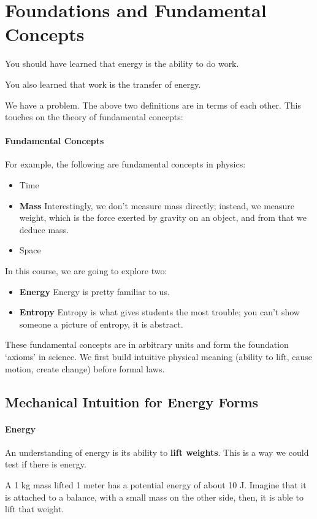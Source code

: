 \documentclass[11pt]{report}
\begin{document}
\section{Foundations and Fundamental Concepts}
\begin{definition}[Energy]
    You should have learned that energy is the ability to do work.
\end{definition}


\begin{definition}[Work]
    You also learned that work is the transfer of energy.
\end{definition}

We have a problem. The above two definitions are in terms of each other. This touches on the theory of fundamental concepts:

\paragraph{Fundamental Concepts} For example, the following are fundamental concepts in physics:
\begin{itemize}
    \item Time
    \item \textbf{Mass} Interestingly, we don't measure mass directly; instead, we measure weight, which is the force exerted by gravity on an object, and from that we deduce mass.
    \item Space
\end{itemize}
In this course, we are going to explore two:
\begin{itemize}
    \item \textbf{Energy} Energy is pretty familiar to us. 
    \item \textbf{Entropy} Entropy is what gives students the most trouble; you can't show someone a picture of entropy, it is abstract.
\end{itemize}

These fundamental concepts are in arbitrary units and form the foundation `axioms' in science. We first build intuitive physical meaning (ability to lift, cause motion, create change) before formal laws.

\subsection{Mechanical Intuition for Energy Forms}
\paragraph{Energy} An understanding of energy is its ability to \textbf{lift weights}. This is a way we could test if there is energy.
\begin{example}
    A 1 kg mass lifted 1 meter has a potential energy of about 10 J. Imagine that it is attached to a balance, with a small mass on the other side, then, it is able to lift that weight.
\end{example}
\end{document}
